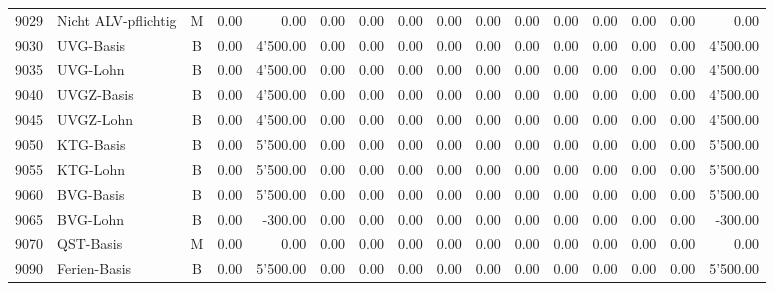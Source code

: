 \documentclass[8pt,a4paper]{extarticle}
\begin{document}
\begin{longtable}{@{\extracolsep{\fill}} l l c r r r r r r r r r r r r r}
9029&Nicht ALV-pflichtig&M&0.00&0.00&0.00&0.00&0.00&0.00&0.00&0.00&0.00&0.00&0.00&0.00&0.00\\
9030&UVG-Basis&B&0.00&4'500.00&0.00&0.00&0.00&0.00&0.00&0.00&0.00&0.00&0.00&0.00&4'500.00\\
9035&UVG-Lohn&B&0.00&4'500.00&0.00&0.00&0.00&0.00&0.00&0.00&0.00&0.00&0.00&0.00&4'500.00\\
9040&UVGZ-Basis&B&0.00&4'500.00&0.00&0.00&0.00&0.00&0.00&0.00&0.00&0.00&0.00&0.00&4'500.00\\
9045&UVGZ-Lohn&B&0.00&4'500.00&0.00&0.00&0.00&0.00&0.00&0.00&0.00&0.00&0.00&0.00&4'500.00\\
9050&KTG-Basis&B&0.00&5'500.00&0.00&0.00&0.00&0.00&0.00&0.00&0.00&0.00&0.00&0.00&5'500.00\\
9055&KTG-Lohn&B&0.00&5'500.00&0.00&0.00&0.00&0.00&0.00&0.00&0.00&0.00&0.00&0.00&5'500.00\\
9060&BVG-Basis&B&0.00&5'500.00&0.00&0.00&0.00&0.00&0.00&0.00&0.00&0.00&0.00&0.00&5'500.00\\
9065&BVG-Lohn&B&0.00&-300.00&0.00&0.00&0.00&0.00&0.00&0.00&0.00&0.00&0.00&0.00&-300.00\\
9070&QST-Basis&M&0.00&0.00&0.00&0.00&0.00&0.00&0.00&0.00&0.00&0.00&0.00&0.00&0.00\\
9090&Ferien-Basis&B&0.00&5'500.00&0.00&0.00&0.00&0.00&0.00&0.00&0.00&0.00&0.00&0.00&5'500.00\\

\end{longtable}
\pagebreak
\end{document}

